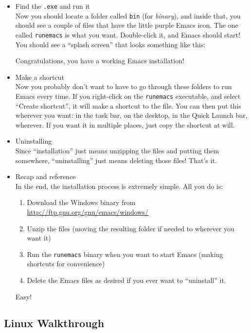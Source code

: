 \documentclass{article}
\begin{document}
\begin{itemize}
\item Find the \texttt{.exe} and run it\\
\label{sec-3-2-2-5}%
Now you should locate a folder called \texttt{bin} (for \emph{binary}), and inside that, you should see a couple of files that have the little purple Emacs icon. The one called \texttt{runemacs} is what you want.  Double-click it, and Emacs should start!  You should see a ``splash screen'' that looks something like this:


Congratulations, you have a working Emacs installation!

\item Make a shortcut\\
\label{sec-3-2-2-6}%
Now you probably don't want to have to go through these folders to run Emacs every time.  If you right-click on the \texttt{runemacs} executable, and select ``Create shortcut'', it will make a shortcut to the file.  You can then put this wherever you want: in the task bar, on the desktop, in the Quick Launch bar, wherever.  If you want it in multiple places, just copy the shortcut at will.

\item Uninstalling\\
\label{sec-3-2-2-7}%
Since ``installation'' just means unzipping the files and putting them somewhere, ``uninstalling'' just means deleting those files!  That's it.

\item Recap and reference\\
\label{sec-3-2-2-8}%
In the end, the installation process is extremely simple.  All you do is:
\begin{enumerate}
\item Download the Windows binary from \href{http://ftp.gnu.org/gnu/emacs/windows/}{http://ftp.gnu.org/gnu/emacs/windows/}
\item Unzip the files (moving the resulting folder if needed to wherever you want it)
\item Run the \texttt{runemacs} binary when you want to start Emacs (making shortcuts for convenience)
\item Delete the Emacs files as desired if you ever want to ``uninstall'' it.
\end{enumerate}

Easy!
\end{itemize} %
\subsection{Linux Walkthrough}
\label{sec-3-3}
\end{document}

